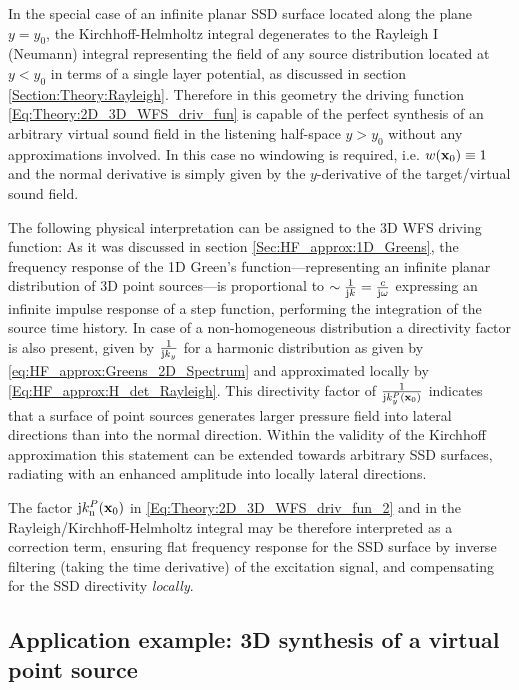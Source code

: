 In the special case of an infinite planar SSD surface located along the plane $y = y_0$, the Kirchhoff-Helmholtz integral degenerates to the Rayleigh I (Neumann) integral representing the field of any source distribution located at $y<y_0$ in terms of a single layer potential, as discussed in section \ref{Section:Theory:Rayleigh}.
Therefore in this geometry the driving function \eqref{Eq:Theory:2D_3D_WFS_driv_fun} is capable of the perfect synthesis of an arbitrary virtual sound field in the listening half-space $y>y_0$ without any approximations involved.
In this case no windowing is required, i.e. $w(\mathbf{x}_0) \equiv 1$ and the normal derivative is simply given by the $y$-derivative of the target/virtual sound field.

\vspace{3mm}
The following physical interpretation can be assigned to the 3D WFS driving function:
As it was discussed in section \ref{Sec:HF_approx:1D_Greens}, the frequency response of the 1D Green's function---representing an infinite planar distribution of 3D point sources---is proportional to $\sim \frac{1}{\mathrm{j} k} = \frac{c}{\mathrm{j} \omega}$ expressing an infinite impulse response of a step function, performing the integration of the source time history. 
In case of a non-homogeneous distribution a directivity factor is also present, given by $\frac{1}{\mathrm{j} k_y}$ for a harmonic distribution as given by \eqref{eq:HF_approx:Greens_2D_Spectrum} and approximated locally by \eqref{Eq:HF_approx:H_det_Rayleigh}.
This directivity factor of $\frac{1}{\mathrm{j} k^P_y(\mathbf{x}_0)}$ indicates that a surface of point sources generates larger pressure field into lateral directions than into the normal direction.
Within the validity of the Kirchhoff approximation this statement can be extended towards arbitrary SSD surfaces, radiating with an enhanced amplitude into locally lateral directions.

The factor $\mathrm{j} k_{\mathrm{n}}^P(\mathbf{x}_0)$ in \eqref{Eq:Theory:2D_3D_WFS_driv_fun_2} and in the Rayleigh/Kirchhoff-Helmholtz integral may be therefore interpreted as a correction term, ensuring flat frequency response for the SSD surface by inverse filtering (taking the time derivative) of the excitation signal, and compensating for the SSD directivity \emph{locally}.

\subsection*{Application example: 3D synthesis of a virtual point source}

